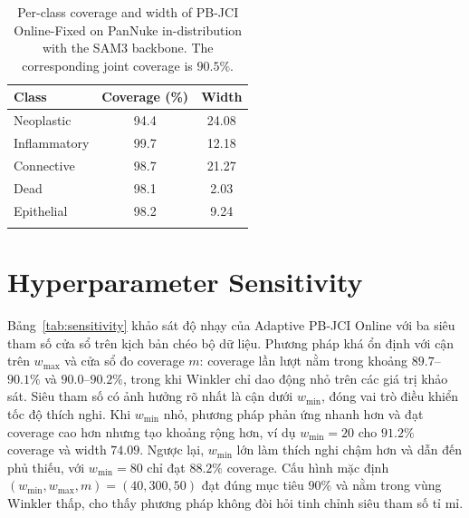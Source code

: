 \documentclass[pdflatex,sn-mathphys-num]{sn-jnl}
\begin{document}
\begin{appendices}
\begin{table}[htbp]
\caption{Per-class coverage and width of PB-JCI Online-Fixed on PanNuke
in-distribution with the SAM3 backbone. The corresponding joint coverage is $90.5\%$.}
\label{tab:perclass}
\centering
\small
\begin{tabular}{@{}lcc@{}}
\toprule
Class & Coverage (\%) & Width \\
\midrule
Neoplastic   & 94.4 & 24.08 \\
Inflammatory & 99.7 & 12.18 \\
Connective   & 98.7 & 21.27 \\
Dead         & 98.1 & 2.03 \\
Epithelial   & 98.2 & 9.24 \\
\botrule
\end{tabular}
\end{table}

\section{Hyperparameter Sensitivity}\label{secA:sensitivity}

Bảng~\ref{tab:sensitivity} khảo sát độ nhạy của Adaptive PB-JCI Online với ba siêu
tham số cửa sổ trên kịch bản chéo bộ dữ liệu. Phương pháp khá ổn định với cận trên
$w_{\max}$ và cửa sổ đo coverage $m$: coverage lần lượt nằm trong khoảng
$89.7$--$90.1\%$ và $90.0$--$90.2\%$, trong khi Winkler chỉ dao động nhỏ trên các giá
trị khảo sát. Siêu tham số có ảnh hưởng rõ nhất là cận dưới $w_{\min}$, đóng vai trò
điều khiển tốc độ thích nghi. Khi $w_{\min}$ nhỏ, phương pháp phản ứng nhanh hơn và đạt
coverage cao hơn nhưng tạo khoảng rộng hơn, ví dụ $w_{\min}=20$ cho $91.2\%$ coverage
và width $74.09$. Ngược lại, $w_{\min}$ lớn làm thích nghi chậm hơn và dẫn đến phủ
thiếu, với $w_{\min}=80$ chỉ đạt $88.2\%$ coverage. Cấu hình mặc định
$(w_{\min},w_{\max},m)=(40,300,50)$ đạt đúng mục tiêu $90\%$ và nằm trong vùng Winkler
thấp, cho thấy phương pháp không đòi hỏi tinh chỉnh siêu tham số tỉ mỉ.


\end{appendices}
\end{document}
